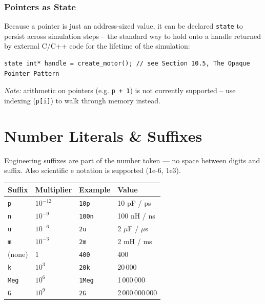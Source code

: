 \documentclass[11pt, a4paper]{article}
\newcommand{\code}[1]{\texttt{\small #1}}
\begin{document}
\subsubsection{Pointers as State}

Because a pointer is just an address-sized value, it can be declared \code{state} to persist across simulation steps -- the standard way to hold onto a handle returned by external C/C++ code for the lifetime of the simulation:

\begin{lstlisting}
state int* handle = create_motor(); // see Section 10.5, The Opaque Pointer Pattern
\end{lstlisting}

\textit{Note:} arithmetic on pointers (e.g. \code{p + 1}) is not currently supported -- use indexing (\code{p[i]}) to walk through memory instead.


\section{Number Literals \& Suffixes}
\label{sec:suffixes}

Engineering suffixes are part of the number token — no space between digits
and suffix. Also scientific e notation is supported (1e-6, 1e3).

\begin{center}
\begin{tabular}{@{} C{2cm} C{2.5cm} C{2.5cm} L{5cm} @{}}
  \toprule
  \textbf{Suffix} & \textbf{Multiplier} & \textbf{Example} & \textbf{Value} \\
  \midrule
  \code{p}   & \(10^{-12}\) & \code{10p}   & 10 pF / ps \\
  \code{n}   & \(10^{-9}\)  & \code{100n}  & 100 nH / ns \\
  \code{u}   & \(10^{-6}\)  & \code{2u}    & 2 \(\mu\)F / \(\mu\)s \\
  \code{m}   & \(10^{-3}\)  & \code{2m}    & 2 mH / ms \\
  (none)     & \(1\)        & \code{400}   & 400 \\
  \code{k}   & \(10^{3}\)   & \code{20k}   & 20\,000 \\
  \code{Meg} & \(10^{6}\)   & \code{1Meg}  & 1\,000\,000 \\
  \code{G}   & \(10^{9}\)   & \code{2G}    & 2\,000\,000\,000 \\
  \bottomrule
\end{tabular}
\end{center}
\end{document}
